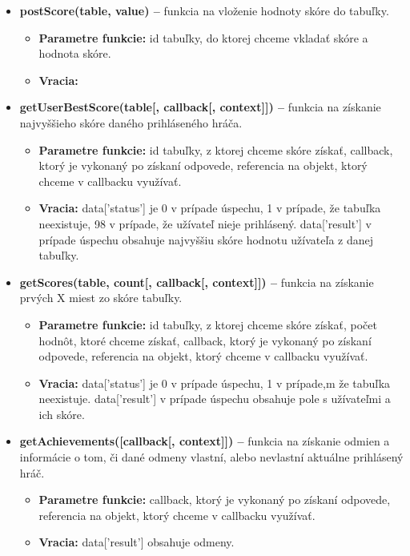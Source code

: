 \begin{itemize}
\item \textbf{postScore(table, value) –} funkcia na vloženie hodnoty skóre do tabuľky.
\begin{itemize}
\item \textbf{Parametre funkcie:} id tabuľky, do ktorej chceme vkladať skóre a hodnota skóre. 
\item \textbf{Vracia:} 
\end{itemize}

\item \textbf{getUserBestScore(table[, callback[, context]]) –} funkcia na získanie najvyššieho skóre daného prihláseného hráča.
\begin{itemize}
\item \textbf{Parametre funkcie:} id tabuľky, z ktorej chceme skóre získať, callback, ktorý je vykonaný po získaní odpovede, referencia na objekt, ktorý chceme v callbacku využívať. 
\item \textbf{Vracia:} data['status'] je 0 v prípade úspechu, 1 v prípade, že tabuľka neexistuje, 98 v prípade, že užívateľ nieje prihlásený. data['result'] v prípade úspechu obsahuje najvyššiu skóre hodnotu užívateľa z danej tabuľky.
\end{itemize}

\item \textbf{getScores(table, count[, callback[, context]]) –} funkcia na získanie prvých X miest zo skóre tabuľky.
\begin{itemize}
\item \textbf{Parametre funkcie:} id tabuľky, z ktorej chceme skóre získať, počet hodnôt, ktoré chceme získať, callback, ktorý je vykonaný po získaní odpovede, referencia na objekt, ktorý chceme v callbacku využívať. 
\item \textbf{Vracia:} data['status'] je 0 v prípade úspechu, 1 v prípade,m že tabuľka neexistuje. data['result'] v prípade úspechu obsahuje pole s užívateľmi a ich skóre.
\end{itemize}

\item \textbf{getAchievements([callback[, context]]) –} funkcia na získanie odmien a informácie o tom, či dané odmeny vlastní, alebo nevlastní aktuálne prihlásený hráč.
\begin{itemize}
\item \textbf{Parametre funkcie:} callback, ktorý je vykonaný po získaní odpovede, referencia na objekt, ktorý chceme v callbacku využívať. 
\item \textbf{Vracia:} data['result'] obsahuje odmeny.
\end{itemize}


\end{itemize}

